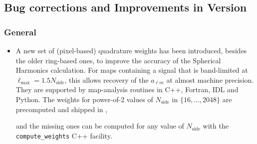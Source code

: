 \documentclass[12pt,twoside]{article}
\newcommand{\nside}{N_\mathrm{side}}
\newcommand{\lmax}{\ell_{\mathrm{max}}}
\newcommand{\linklatexhtml}[3]{%
\latexhtml{\htmladdnormallink{#1}{#2}}{\htmladdnormallink{#1}{#3}}}
\begin{document}
\subsection{Bug corrections and Improvements in Version \hpxversion}%

\subsubsection[General]{General}
\begin{itemize}
\item A new set of (pixel-based) quadrature weights has been introduced, besides the older ring-based ones, to improve the accuracy of the Spherical Harmonics calculation. For maps
  containing a signal that is band-limited at $\lmax=1.5 \nside$, this allows
  recovery of the $a_{\ell m}$ at almost machine precision. They are supported by map-analysis routines in C++, Fortran, IDL and Python. 
The weights for power-of-2 values of $\nside$ in $\{16,\ldots,2048\}$ are precomputed and shipped in
, 

and the missing ones can be computed for any value of $\nside$ with the \texttt{compute\_weights} C++ facility.
\end{itemize}
\end{document}
